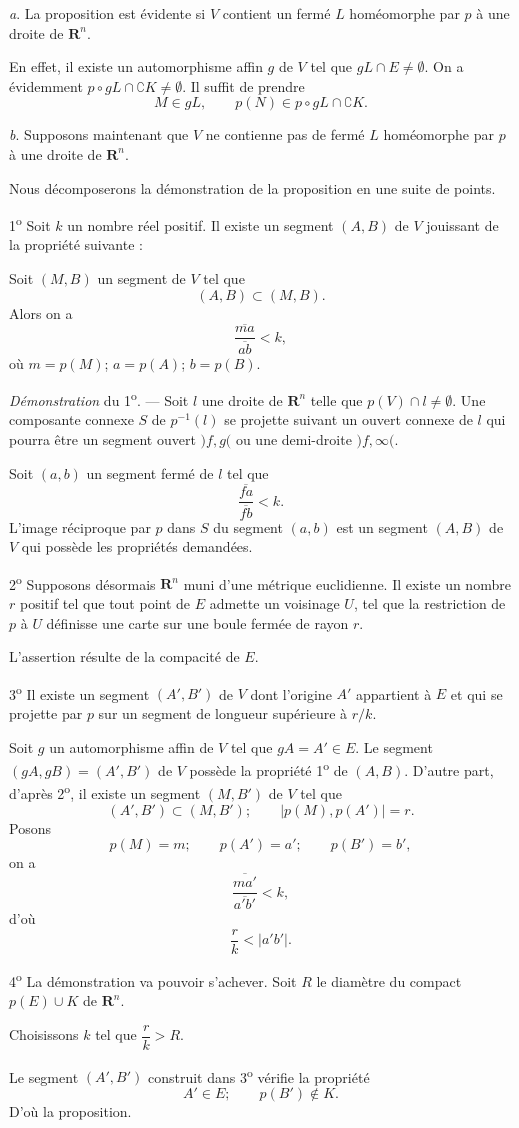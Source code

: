\documentclass[11pt]{article}
\newcommand{\R}{\boldsymbol{R}}
\newenvironment{proof}[1][]{\par}{\par}
\begin{document}
\begin{proof}
\textit{a}. La proposition est évidente si $V$ contient un fermé $L$ homéomorphe par $p$ à une
droite de $\R^n$.

En effet, il existe un automorphisme affin $g$ de $V$ tel que $gL\cap E\neq\emptyset$. On a
évidemment $p\circ gL\cap\complement K\neq\emptyset$. Il suffit de prendre
\[ M\in gL, \qquad p(N)\in p\circ gL\cap\complement K. \]

\textit{b}. Supposons maintenant que $V$ ne contienne pas de fermé $L$ homéomorphe par $p$ à une
droite de $\R^n$.

Nous décomposerons la démonstration de la proposition en une suite de points.

1\textsuperscript{o} Soit $k$ un nombre réel positif. Il existe un segment $(A, B)$ de $V$
jouissant de la propriété suivante :

Soit $(M, B)$ un segment de $V$ tel que
\[ (A, B)\subset(M, B). \]
Alors on a
\[ \frac{\overline{ma}}{\overline{ab}}<k, \]
où $m=p(M)$; $a=p(A)$; $b=p(B)$.

\textit{Démonstration} du 1\textsuperscript{o}. --- Soit $l$ une droite de $\R^n$ telle que
$p(V)\cap l\neq\emptyset$. Une composante connexe $S$ de $p^{-1}(l)$ se projette suivant un ouvert
connexe de $l$ qui pourra être un segment ouvert $)f, g($ ou une demi-droite $)f, \infty($.

Soit $(a, b)$ un segment fermé de $l$ tel que
\[ \frac{\overline{fa}}{\overline{fb}}<k. \]
L'image réciproque par $p$ dans $S$ du segment $(a, b)$ est un segment $(A, B)$ de $V$ qui possède
les propriétés demandées.

2\textsuperscript{o} Supposons désormais $\R^n$ muni d'une métrique euclidienne. Il existe un
nombre $r$ positif tel que tout point de $E$ admette un voisinage $U$, tel que la restriction de
$p$ à $U$ définisse une carte sur une boule fermée de rayon $r$.

L'assertion résulte de la compacité de $E$.

3\textsuperscript{o} Il existe un segment $(A', B')$ de $V$ dont l'origine $A'$ appartient à $E$
et qui se projette par $p$ sur un segment de longueur supérieure à $r/k$.

Soit $g$ un automorphisme affin de $V$ tel que $gA=A'\in E$. Le segment $(gA, gB)=(A', B')$ de
$V$ possède la propriété 1\textsuperscript{o} de $(A, B)$. D'autre part, d'après
2\textsuperscript{o}, il existe un segment $(M, B')$ de $V$ tel que
\[ (A', B')\subset(M, B'); \qquad |p(M), p(A')|=r. \]
Posons
\[ p(M)=m; \qquad p(A')=a'; \qquad p(B')=b', \]
on a
\[ \frac{\overline{ma'}}{\overline{a'b'}}<k, \]
d'où
\[ \frac{r}{k}<|a'b'|. \]

4\textsuperscript{o} La démonstration va pouvoir s'achever. Soit $R$ le diamètre du compact
$p(E)\cup K$ de $\R^n$.

Choisissons $k$ tel que $\dfrac{r}{k}>R$.

Le segment $(A', B')$ construit dans 3\textsuperscript{o} vérifie la propriété
\[ A'\in E; \qquad p(B')\notin K. \]
D'où la proposition.
\end{proof}
\end{document}
